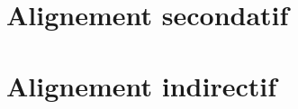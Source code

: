 \documentclass[oldfontcommands,twoside,a4paper,12pt]{article}
\begin{document}
\section{Alignement secondatif}
 
 
 
 
 
\section{Alignement indirectif}
 



\end{document}
